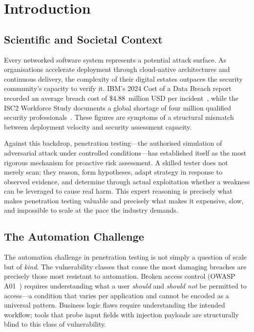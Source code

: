 \documentclass[12pt,a4paper,oneside,openany]{book}
\begin{document}
\chapter{Introduction}
\label{ch:intro}

\section{Scientific and Societal Context}

Every networked software system represents a potential attack surface. As organisations accelerate deployment through cloud-native architectures and continuous delivery, the complexity of their digital estates outpaces the security community's capacity to verify it. IBM's 2024 Cost of a Data Breach report recorded an average breach cost of \$4.88~million USD per incident~\citep{ibm2024breach}, while the ISC2 Workforce Study documents a global shortage of four million qualified security professionals~\citep{isc22023}. These figures are symptoms of a structural mismatch between deployment velocity and security assessment capacity.

Against this backdrop, penetration testing---the authorised simulation of adversarial attack under controlled conditions---has established itself as the most rigorous mechanism for proactive risk assessment. A skilled tester does not merely scan; they reason, form hypotheses, adapt strategy in response to observed evidence, and determine through actual exploitation whether a weakness can be leveraged to cause real harm. This expert reasoning is precisely what makes penetration testing valuable and precisely what makes it expensive, slow, and impossible to scale at the pace the industry demands.

\section{The Automation Challenge}

The automation challenge in penetration testing is not simply a question of scale but of \textit{kind}. The vulnerability classes that cause the most damaging breaches are precisely those most resistant to automation. Broken access control (OWASP A01~\citep{owasptop10}) requires understanding what a user \textit{should} and \textit{should not} be permitted to access---a condition that varies per application and cannot be encoded as a universal pattern. Business logic flaws require understanding the intended workflow; tools that probe input fields with injection payloads are structurally blind to this class of vulnerability.
\end{document}
